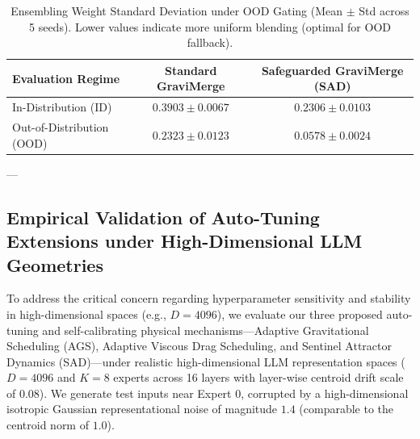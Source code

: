 \begin{table}[h]
\caption{Ensembling Weight Standard Deviation under OOD Gating (Mean $\pm$ Std across 5 seeds). Lower values indicate more uniform blending (optimal for OOD fallback).}
\label{tab:ood_resilience}
\begin{center}
\begin{small}
\begin{sc}
\begin{tabular}{lcc}
\toprule
Evaluation Regime & Standard GraviMerge & Safeguarded GraviMerge (SAD) \\
\midrule
In-Distribution (ID) & $0.3903 \pm 0.0067$ & $0.2306 \pm 0.0103$ \\
Out-of-Distribution (OOD) & $0.2323 \pm 0.0123$ & $\mathbf{0.0578 \pm 0.0024}$ \\
\bottomrule
\end{tabular}
\end{sc}
\end{small}
\end{center}
\end{table}

---

\subsection{Empirical Validation of Auto-Tuning Extensions under High-Dimensional LLM Geometries}
\label{sec:appendix_high_dim_validation}
To address the critical concern regarding hyperparameter sensitivity and stability in high-dimensional spaces (e.g., $D=4096$), we evaluate our three proposed auto-tuning and self-calibrating physical mechanisms---Adaptive Gravitational Scheduling (AGS), Adaptive Viscous Drag Scheduling, and Sentinel Attractor Dynamics (SAD)---under realistic high-dimensional LLM representation spaces ($D=4096$ and $K=8$ experts across 16 layers with layer-wise centroid drift scale of $0.08$). We generate test inputs near Expert 0, corrupted by a high-dimensional isotropic Gaussian representational noise of magnitude $1.4$ (comparable to the centroid norm of $1.0$).

